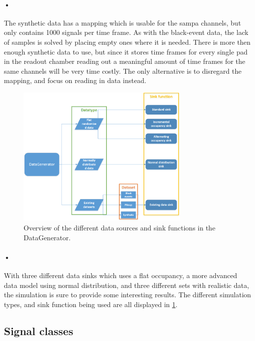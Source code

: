 \documentclass[a4paper, 12pt]{report}
\begin{document}
\paragraph{•}
The synthetic data has a mapping which is usable for the \gls{sampa} channels, but only contains 1000 signals per time frame.
As with the black-event data, the lack of samples is solved by placing empty ones where it is needed.
There is more then enough synthetic data to use, but since it stores time frames for every single pad in the readout chamber reading out a meaningful amount of time frames for the same channels will be very time costly.
The only alternative is to disregard the mapping, and focus on reading in data instead.

\begin{figure}[h!]
	\centering
		\includegraphics[width=0.75\textwidth]{images/dg-overview.png}
		\caption{Overview of the different data sources and sink functions in the DataGenerator.}
		\label{fig:dg-overview}
\end{figure}

\paragraph{•}
With three different data sinks which uses a flat occupancy, a more advanced data model using normal distribution, and three different sets with realistic data, the simulation is sure to provide some interesting results.
The different simulation types, and sink function being used are all displayed in \ref{fig:dg-overview}.

\subsection{Signal classes}
\label{subsec:signal-classes}
\end{document}
